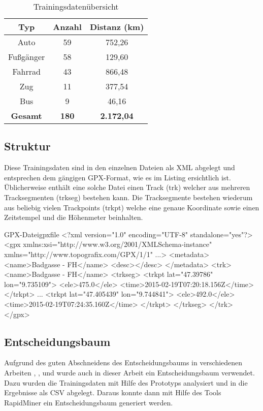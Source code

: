 \begin{table}
\centering
\begin{tabular}{| c | c | c | }
\hline
\textbf{Typ} & \textbf{Anzahl} & \textbf{Distanz (km)}\\ 
\hline
Auto &	59 & 752,26\\
\hline
Fußgänger &	58 & 129,60\\
\hline
Fahrrad	& 43 & 866,48\\
\hline
Zug & 11 & 377,54\\
\hline
Bus	& 9 & 46,16\\
\hline
\textbf{Gesamt} & \textbf{180} & \textbf{2.172,04}\\
\hline
\end{tabular}
\caption{Trainingsdatenübersicht}
\label{datenuebsicht}
\end{table}

\subsection{Struktur}
Diese Trainingsdaten sind in den einzelnen Dateien als XML abgelegt und entsprechen dem gängigen GPX-Format, wie es im Listing  ersichtlich ist. Üblicherweise enthält eine solche Datei einen Track (trk) welcher aus mehreren Tracksegmenten (trkseg) bestehen kann. Die Tracksegmente bestehen wiederum aus beliebig vielen Trackpoints (trkpt) welche eine genaue Koordinate sowie einen Zeitstempel und die Höhenmeter beinhalten.


\begin{code}[xml]{GPX-Datei}{gpxfile}
<?xml version="1.0" encoding="UTF-8" standalone="yes"?>
<gpx xmlns:xsi="http://www.w3.org/2001/XMLSchema-instance" xmlns="http://www.topografix.com/GPX/1/1" ...>
    <metadata>
        <name>Badgasse - FH</name>
        <desc></desc>
    </metadata>
    <trk>
        <name>Badgasse - FH</name>
        <trkseg>
            <trkpt lat="47.39786" lon="9.735109">
                <ele>475.0</ele>
                <time>2015-02-19T07:20:18.156Z</time>
            </trkpt>
            ...
            <trkpt lat="47.405439" lon="9.744841">
                <ele>492.0</ele>
                <time>2015-02-19T07:24:35.160Z</time>
            </trkpt>
        </trkseg>
    </trk>
</gpx>
\end{code}

\subsection{Entscheidungsbaum}
Aufgrund des guten Abschneidens des Entscheidungsbaums in verschiedenen Arbeiten  \cite{stenneth_transportation_2011}, \cite{reddy_using_2010}, \cite{sebastian_nagel_moglichkeitsstudie_2011}und \cite{zheng_learning_2008} wurde auch in dieser Arbeit ein Entscheidungsbaum verwendet. Dazu wurden die Trainingsdaten mit Hilfe des Prototyps analysiert und in die Ergebnisse als CSV abgelegt. Daraus konnte dann mit Hilfe des Tools RapidMiner ein Entscheidungsbaum generiert werden. 

